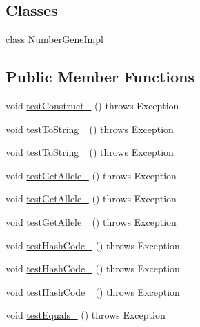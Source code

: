 \subsection*{Classes}
\begin{DoxyCompactItemize}
\item 
class \hyperlink{classorg_1_1jgap_1_1impl_1_1_number_gene_test_1_1_number_gene_impl}{Number\-Gene\-Impl}
\end{DoxyCompactItemize}
\subsection*{Public Member Functions}
\begin{DoxyCompactItemize}
\item 
void \hyperlink{classorg_1_1jgap_1_1impl_1_1_number_gene_test_a3c0e1b6234ad38317647b3a6149dd20f}{test\-Construct\-\_} ()  throws Exception 
\item 
void \hyperlink{classorg_1_1jgap_1_1impl_1_1_number_gene_test_aec44cec61d4623c92ea309cd4ae581f3}{test\-To\-String\-\_} ()  throws Exception 
\item 
void \hyperlink{classorg_1_1jgap_1_1impl_1_1_number_gene_test_a076c0ec986c6d5845d6dba8065823684}{test\-To\-String\-\_} ()  throws Exception 
\item 
void \hyperlink{classorg_1_1jgap_1_1impl_1_1_number_gene_test_a425fed5eb6ecdbe156a11e7ccd7ddb3f}{test\-Get\-Allele\-\_} ()  throws Exception 
\item 
void \hyperlink{classorg_1_1jgap_1_1impl_1_1_number_gene_test_aa9115dd2fc5e4b418011566e6c021134}{test\-Get\-Allele\-\_} ()  throws Exception 
\item 
void \hyperlink{classorg_1_1jgap_1_1impl_1_1_number_gene_test_a09434d6c07e06c892a179f5082b291c1}{test\-Get\-Allele\-\_} ()  throws Exception 
\item 
void \hyperlink{classorg_1_1jgap_1_1impl_1_1_number_gene_test_a1c5d19c5f70034b8b19f70fdd2b1b4d0}{test\-Hash\-Code\-\_} ()  throws Exception 
\item 
void \hyperlink{classorg_1_1jgap_1_1impl_1_1_number_gene_test_ae4a300178e7141b5848d729bca736f0f}{test\-Hash\-Code\-\_} ()  throws Exception 
\item 
void \hyperlink{classorg_1_1jgap_1_1impl_1_1_number_gene_test_a6683c3d8c42c06940c87c8c87c6ac33c}{test\-Hash\-Code\-\_} ()  throws Exception 
\item 
void \hyperlink{classorg_1_1jgap_1_1impl_1_1_number_gene_test_a1a7f38470eae3f1d0ac0228ca871a4f6}{test\-Equals\-\_} ()  throws Exception 

\end{DoxyCompactItemize}
